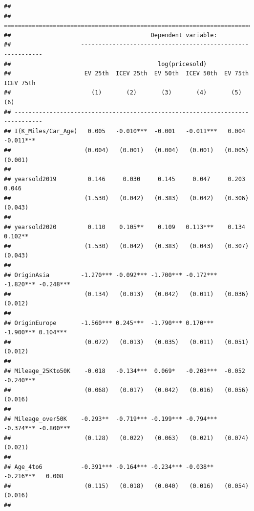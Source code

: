 \documentclass{article}
\begin{document}
\begin{verbatim}
## 
## ==============================================================================
##                                        Dependent variable:                    
##                    -----------------------------------------------------------
##                                          log(pricesold)                       
##                     EV 25th  ICEV 25th  EV 50th  ICEV 50th  EV 75th  ICEV 75th
##                       (1)       (2)       (3)       (4)       (5)       (6)   
## ------------------------------------------------------------------------------
## I(K_Miles/Car_Age)   0.005   -0.010***  -0.001   -0.011***   0.004   -0.011***
##                     (0.004)   (0.001)   (0.004)   (0.001)   (0.005)   (0.001) 
##                                                                               
## yearsold2019         0.146     0.030     0.145     0.047     0.203     0.046  
##                     (1.530)   (0.042)   (0.383)   (0.042)   (0.306)   (0.043) 
##                                                                               
## yearsold2020         0.110    0.105**    0.109   0.113***    0.134    0.102** 
##                     (1.530)   (0.042)   (0.383)   (0.043)   (0.307)   (0.043) 
##                                                                               
## OriginAsia         -1.270*** -0.092*** -1.700*** -0.172*** -1.820*** -0.248***
##                     (0.134)   (0.013)   (0.042)   (0.011)   (0.036)   (0.012) 
##                                                                               
## OriginEurope       -1.560*** 0.245***  -1.790*** 0.170***  -1.900*** 0.104*** 
##                     (0.072)   (0.013)   (0.035)   (0.011)   (0.051)   (0.012) 
##                                                                               
## Mileage_25Kto50K    -0.018   -0.134***  0.069*   -0.203***  -0.052   -0.240***
##                     (0.068)   (0.017)   (0.042)   (0.016)   (0.056)   (0.016) 
##                                                                               
## Mileage_over50K    -0.293**  -0.719*** -0.199*** -0.794*** -0.374*** -0.800***
##                     (0.128)   (0.022)   (0.063)   (0.021)   (0.074)   (0.021) 
##                                                                               
## Age_4to6           -0.391*** -0.164*** -0.234*** -0.038**  -0.216***   0.008  
##                     (0.115)   (0.018)   (0.040)   (0.016)   (0.054)   (0.016) 
##                                                                               

\end{verbatim}
\end{document}
